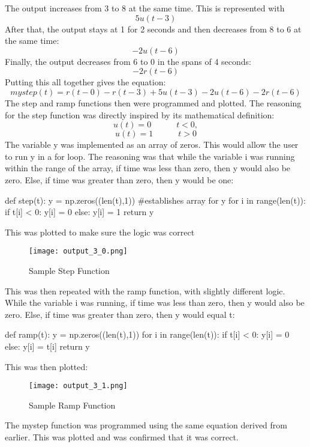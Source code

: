 \documentclass[12pt]{article}
\begin{document}
The output increases from 3 to 8 at the same time. This is represented with
\[5u(t-3)\]
After that, the output stays at 1 for 2 seconds and then decreases from 8 to 6 at the same time:
\[-2u(t-6)\]
Finally, the output decreases from 6 to 0 in the spans of 4 seconds:
\[-2r(t-6)\]
Putting this all together gives the equation:
\[mystep(t) = r(t-0) - r(t-3) + 5u(t-3) - 2u(t-6) - 2r(t-6)\]
\newline
The step and ramp functions then were programmed and plotted.
  The reasoning for the step function was directly inspired by its mathematical definition:
\[u(t) = 0  \hspace{3em} t < 0,\]
\[u(t) = 1  \hspace{3em} t > 0\]
The variable y was implemented as an array of zeros. This would allow the user to run y in a for loop.
The reasoning was that while the variable i was running within the range of the array, if time was less than zero, then y would also be zero. Else, if time was greater than zero, then y would be one:
\begin{python}
def step(t):
    y = np.zeros((len(t),1)) #establishes array for y
    for i in range(len(t)):
        if t[i] < 0:
             y[i] = 0 
        else:
             y[i] = 1
    return y
\end{python}
This was plotted to make sure the logic was correct
\begin{figure}[H]
\texttt{[image: output\_3\_0.png]}
  \caption{Sample Step Function}
  \end{figure}
This was then repeated with the ramp function, with slightly different logic.
While the variable i was running, if time was less than zero, then y would also be zero. Else, if time was greater than zero, then y would equal t:
\begin{python}
def ramp(t):
    y = np.zeros((len(t),1))
    for i in range(len(t)):
        if t[i] < 0:
            y[i] = 0
        else:
            y[i] = t[i]
    return y
    \end{python}
This was then plotted:
\begin{figure}[H]
\texttt{[image: output\_3\_1.png]}
  \caption{Sample Ramp Function}
  \end{figure}
The mystep function was programmed using the same equation derived from earlier. This was plotted and was confirmed that it was correct.
\end{document}
